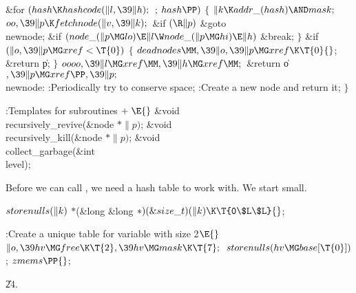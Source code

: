 \&{for} ${}(\\{hash}\K\\{hashcode}(\|l,\39\|h);{}$  ; ${}\\{hash}\PP){}$\5
${}\{{}$\1\6
${}\|k\K\\{addr\_}(\\{hash})\AND\\{mask};{}$\6
${}\\{oo},\39\|p\K\\{fetchnode}(\|v,\39\|k);{}$\6
\&{if} ${}(\R\|p){}$\1\5
\&{goto} \\{newnode};\2\6
\&{if} ${}(\\{node\_}(\|p\MG\\{lo})\E\|l\W\\{node\_}(\|p\MG\\{hi})\E\|h){}$\1\5
\&{break};\2\6
\4${}\}{}$\2\6
\&{if} ${}(\|o,\39\|p\MG\\{xref}<\T{0}){}$\5
${}\{{}$\1\6
${}\\{deadnodes}\MM,\39\|o,\39\|p\MG\\{xref}\K\T{0}{}$;\6
\&{return} \|p;\6
\4${}\}{}$\2\6
${}\\{oooo},\39\|l\MG\\{xref}\MM,\39\|h\MG\\{xref}\MM;{}$\6
\&{return} \|o${},\39\|p\MG\\{xref}\PP,\39\|p;{}$\6
\4\\{newnode}:\5
:Periodically try to conserve space\X;\6
:Create a new node and return it\X;\6
\4${}\}{}$\2\par
\fi

\B{}:Templates for subroutines\X${}\mathrel+\E{}$\6
\&{void} \\{recursively\_revive}(\&{node} ${}{*}\|p){}$;\6
\&{void} \\{recursively\_kill}(\&{node} ${}{*}\|p){}$;\6
\&{void} \\{collect\_garbage}(\&{int} \\{level});\par
\fi

Before we can call , we need a hash table to work
with.
We start small.

\Y\B\4\D$\\{storenulls}(\|k)$ \5
${*}{}$(\&{long} \&{long} ${}{*})(\&{size\_t})(\|k)\K\T{0\$L\$L}{}$;\par
\Y\B\4:Create a unique table for variable  with size 2\X${}\E{}$%
\6
$\|o,\39\\{hv}\MG\\{free}\K\T{2},\39\\{hv}\MG\\{mask}\K\T{7};{}$\6
${}\\{storenulls}(\\{hv}\MG\\{base}[\T{0}]){}$;\6
${}\\{zmems}\PP{}$;\par
\U24.\fi

